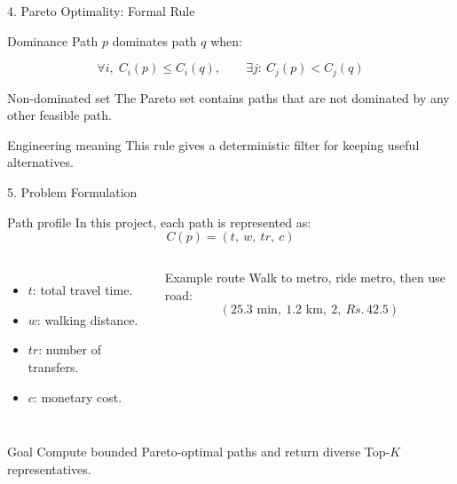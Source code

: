 \documentclass[aspectratio=169]{beamer}
\newcommand{\Rupee}{Rs.\,}
\begin{document}
\begin{frame}{4. Pareto Optimality: Formal Rule}
    \begin{block}{Dominance}
        Path \(p\) dominates path \(q\) when:
    \end{block}

    \[
        \forall i,\; C_i(p) \le C_i(q),
        \qquad
        \exists j:\ C_j(p) < C_j(q)
    \]

    \begin{block}{Non-dominated set}
        The Pareto set contains paths that are not dominated by any other feasible path.
    \end{block}

    \begin{alertblock}{Engineering meaning}
        This rule gives a deterministic filter for keeping useful alternatives.
    \end{alertblock}
\end{frame}

\begin{frame}{5. Problem Formulation}
    \begin{block}{Path profile}
        In this project, each path is represented as:
        \[
            C(p) = (t,\ w,\ tr,\ c)
        \]
    \end{block}

    \begin{columns}[T]
        \begin{itemize}
            \item \(t\): total travel time.
            \item \(w\): walking distance.
            \item \(tr\): number of transfers.
            \item \(c\): monetary cost.
        \end{itemize}

        \begin{block}{Example route}
            Walk to metro, ride metro, then use road:
            \[
                (25.3\text{ min},\ 1.2\text{ km},\ 2,\ \Rupee 42.5)
            \]
        \end{block}
    \end{columns}

    \begin{alertblock}{Goal}
        Compute bounded Pareto-optimal paths and return diverse Top-\(K\) representatives.
    \end{alertblock}
\end{frame}
\end{document}
